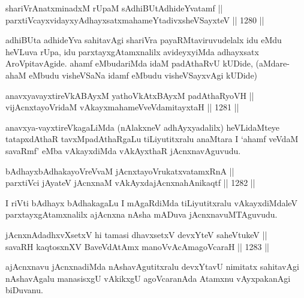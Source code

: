 
\begin{shl}
shariVrAnatxminadxM rUpaM sAdhiBUtAdhideYvatamf || \\
parxtiVcayxvidayxyA\s dhayxsatxmahameYtadivxsheVSayxteV \hfill || 1280 ||  
\end{shl}

\begin{artha}
adhiBUta adhideYva sahitavAgi shariVra payaRMtaviruvudelalx idu eMdu heVLuva rUpa, idu parxtayxgAtamxnalilx avideyxyiMda adhayxsatx AroVpitavAgide. ahamf eMbudariMda idaM padAthaRvU kUDide, (aMdare-ahaM eMbudu visheVSaNa idamf eMbudu visheVSayxvAgi kUDide)
\end{artha}


\begin{shl}
anavxyavayxtireVkABAyxM yathoVkAtxBAyxM padAthaRyoVH ||  \\
vijAcnxtayoVridaM vAkayxmahameVveVdamitayxtaH \hfill || 1281 ||  
\end{shl}

\begin{artha}
anavxya-vayxtireVkagaLiMda (nAlakxneV adhAyxyadalilx) heVLidaMteye tatapxdAthaR tavxMpadAthaRgaLu tiLiyutitxralu anaMtara I `ahamf veVdaM savaRmf' eMba vAkayxdiMda vAkAyxthaR jAcnxnavAguvudu.
\end{artha}


\begin{shl}
bAdhayxbAdhakayoVreVvaM jAcnxtayoVrukatxvatamxRnA || \\
parxtiVci jAyateV jAcnxnaM vAkAyxdajAcnxnahAnikaqtf \hfill || 1282 ||  
\end{shl}

\begin{artha}
I riVti bAdhayx bAdhakagaLu I mAgaRdiMda tiLiyutitxralu vAkayxdiMdaleV parxtayxgAtamxnalilx ajAcnxna nAsha mADuva jAcnxnavuMTAguvudu.
\end{artha}

\begin{shl}
jAcnxnAdadhxvXsetxV hi tamasi dhavxsetxV devxYteV saheVtukeV || \\
savaRH kaqtosxnXV BaveVdAtAmx manoVvAcAmagoVcaraH \hfill || 1283 ||  
\end{shl}

\begin{artha}
ajAcnxnavu jAcnxnadiMda nAshavAgutitxralu devxYtavU nimitatx sahitavAgi nAshavAgalu manasisxgU vAkikxgU agoVcaranAda Atamxnu vAyxpakanAgi biDuvanu.
\end{artha}

